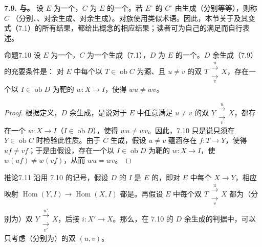 \textbf{7.9. 与。} 设 $E$ 为一个，$C$ 为 $E$ 的一个。若 $E^\circ$ 的 $C^\circ$ 由生成（分别等等），则称 $C$ （分别、、对余生成、对余生成）。对族使用类似术语。因此，本节关于及其变式（7.1）的所有结果，都给出概念的相应结果；读者可为自己的满足而自行表述。
\begin{SGAresult}{命题}{7.10}
设 $E$ 为一个，$C$ 为一个生成（7.1），$D$ 为 $E$ 的一个。$D$ 余生成（7.9）的充要条件是：
对 $E$ 中每个以 $T\in\operatorname{ob}C$ 为源、且 $u\ne v$ 的双 $T\mathrel{\substack{\xrightarrow{u}\\[-.6ex]\xrightarrow[v]{}}}X$，存在一个以 $I\in\operatorname{ob}D$ 为靶的 $w:X\to I$，使得 $wu\ne wv$。
\end{SGAresult}
\begin{proof}
根据定义，$D$ 余生成，是说对于 $E$ 中任意满足 $u\ne v$ 的双 $Y\mathrel{\substack{\xrightarrow{u}\\[-.6ex]\xrightarrow[v]{}}}X$，都存在一个 $w:X\to I$（$I\in\operatorname{ob}D$），使得 $wu\ne wv$。因此，7.10 只是说只须在 $Y\in\operatorname{ob}C$ 时检验此性质。由于 $C$ 生成，假设 $u\ne v$ 蕴涵存在 $f:T\to Y$，使得 $uf\ne vf$；于是由假设，存在一个以 $I\in\operatorname{ob}D$ 为靶的 $w:X\to I$，使 $w(uf)\ne w(vf)$，从而 $wu=wv$。
\end{proof}
\begin{SGAresult}{推论}{7.11}
沿用 7.10 的记号，假设 $D$ 的 $I$ 是 $E$ 的，即对 $E$ 中每个 $X\to Y$，相应映射 $\operatorname{Hom}(Y,I)\to\operatorname{Hom}(X,I)$ 都是。再假设 $E$ 中每个双 $T\mathrel{\substack{\xrightarrow{u}\\[-.6ex]\xrightarrow[v]{}}}X$ 都为（分别为）双 $Y\mathrel{\substack{\xrightarrow{u'}\\[-.6ex]\xrightarrow[v']{}}}X$，后接 $i:X'\to X$。那么，在 7.10 的 $D$ 余生成的判据中，可以只考虑（分别为）的双 $(u,v)$。
\end{SGAresult}
